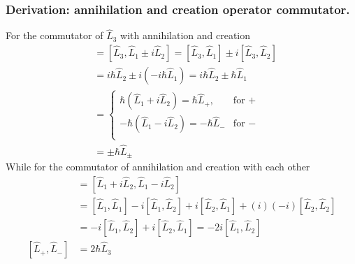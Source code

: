 \documentclass[../../../main.tex]{subfiles}
\begin{document}
\subsubsection{Derivation: annihilation and creation operator commutator.}
For the commutator of $\hat{L}_3$ with annihilation and creation
\begin{align*}
    [\hat{L}_3, \hat{L}_\pm]
     & =  [\hat{L}_3, \hat{L}_1 \pm i\hat{L}_2] = [\hat{L}_3, \hat{L}_1] \pm i[\hat{L}_3, \hat{L}_2] \\
     & =  i\hbar \hat{L}_2 \pm i(-i\hbar \hat{L}_1)=  i\hbar \hat{L}_2 \pm \hbar \hat{L}_1           \\
     & = \begin{cases}
             \hbar(\hat{L}_1 + i\hat{L}_2) = \hbar \hat{L}_+,  & \text{for } + \\
             -\hbar(\hat{L}_1 - i\hat{L}_2) = -\hbar \hat{L}_- & \text{for } - \\
         \end{cases}                           \\
     & =  \pm \hbar \hat{L}_\pm
\end{align*}
While for the commutator of annihilation and creation with each other
\begin{align*}
    [\hat{L}_{+}, \hat{L}_{-}]
     & =  [\hat{L}_1 + i\hat{L}_2, \hat{L}_1 - i\hat{L}_2]                                                           \\
     & =  [\hat{L}_1, \hat{L}_1] - i[\hat{L}_1, \hat{L}_2] + i[\hat{L}_2, \hat{L}_1] + (i)(-i)[\hat{L}_2, \hat{L}_2] \\
     & =  -i[\hat{L}_1, \hat{L}_2] + i[\hat{L}_2, \hat{L}_1]=-2i[\hat{L}_1, \hat{L}_2]                               \\
    [\hat{L}_{+}, \hat{L}_{-}]
     & =  2\hbar \hat{L}_3                                                                                         
\end{align*}
\end{document}
